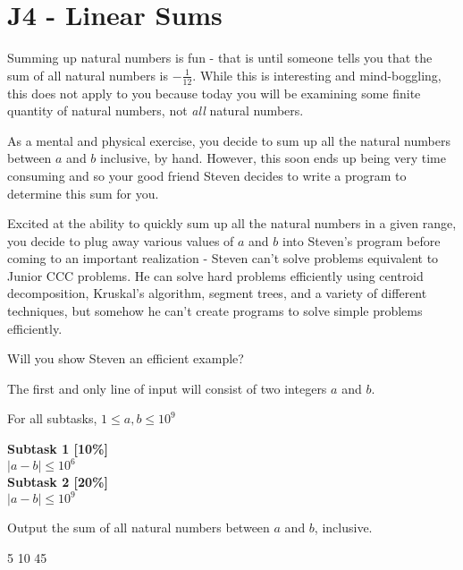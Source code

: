 \section*{J4 - Linear Sums}
Summing up natural numbers is fun - that is until someone tells you that the sum of all natural numbers is $−\frac{1}{12}$. While this is interesting and mind-boggling, this does not apply to you because today you will be examining some finite quantity of natural numbers, not \textit{all} natural numbers.

As a mental and physical exercise, you decide to sum up all the natural numbers between $a$ and $b$ inclusive, by hand. However, this soon ends up being very time consuming and so your good friend Steven decides to write a program to determine this sum for you.

Excited at the ability to quickly sum up all the natural numbers in a given range, you decide to plug away various values of $a$ and $b$ into Steven's program before coming to an important realization - Steven can't solve problems equivalent to Junior CCC problems. He can solve hard problems efficiently using centroid decomposition, Kruskal's algorithm, segment trees, and a variety of different techniques, but somehow he can't create programs to solve simple problems efficiently.

Will you show Steven an efficient example?

The first and only line of input will consist of two integers $a$ and $b$.

\constraints
For all subtasks, $1 \leq a, b \leq 10^9$

\textbf{Subtask 1 [10\%]} \\
$|a - b| \leq 10^6$ \\

\textbf{Subtask 2 [20\%]} \\
$|a - b| \leq 10^9$

\outputformat
Output the sum of all natural numbers between $a$ and $b$, inclusive.

\addsample
{
    5 10
}
{
    45
}